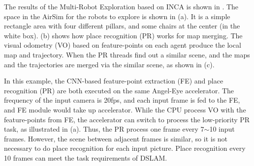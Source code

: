 The results of the Multi-Robot Exploration based on INCA is shown in . The space in the AirSim \cite{shah2018airsim} for the robots to explore is shown in (a). It is a simple rectangle area with four different pillars, and some chairs at the center (in the white box). (b) shows how place recognition (PR) works for map merging. The visual odometry (VO) based on feature-points on each agent produce the local map and trajectory. When the PR threads find out a similar scene, and the maps and the trajectories are merged via the similar scene, as shown in (c).

In this example, the CNN-based feature-point extraction (FE) and place recognition (PR) are both executed on the same Angel-Eye \cite{guo2017angel} accelerator. The frequency of the input camera is 20fps, and each input frame is fed to the FE, and FE module would take up accelerator. While the CPU process VO with the feature-points from FE, the accelerator can switch to process the low-priority PR task, as illustrated in (a). Thus, the PR process one frame every 7$\sim$10 input frames.
However, the scene between adjacent frames is similar, so it is not necessary to do place recognition for each input picture. Place recognition every 10 frames can meet the task requirements of DSLAM.